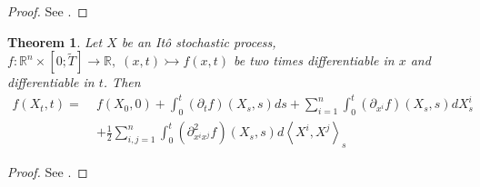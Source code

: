 \documentclass[12pt]{article}
\newtheorem{theorem}{Theorem}[section]
\begin{document}
	\begin{proof}
		See \cite{fima2Lecture}.
	\end{proof}
	\begin{theorem}
		Let $X$ be an Itô stochastic process, $f: \mathbb{R}^n \times [0;\tilde{T}] \rightarrow \mathbb{R}, \; (x,t) \rightarrowtail f(x, t)$ be two times differentiable in $x$ and differentiable in $t$. Then
		\begin{align*}
			f(X_t, t) = \;&f(X_0, 0) + \int_{0}^{t}(\partial_{t}f)(X_s, s)ds + \sum_{i=1}^{n}\int_{0}^{t}(\partial_{x^i}f)(X_s, s)dX^i_s \\
			&+ \frac{1}{2} \sum_{i,j=1}^{n}\int_{0}^{t}(\partial^2_{x^ix^j}f)(X_s, s)d\left\langle X^i, X^j\right\rangle_s
		\end{align*}
		
	\end{theorem}
	\begin{proof}
		See \cite{fima2Lecture}.
	\end{proof}
	
\end{document}
